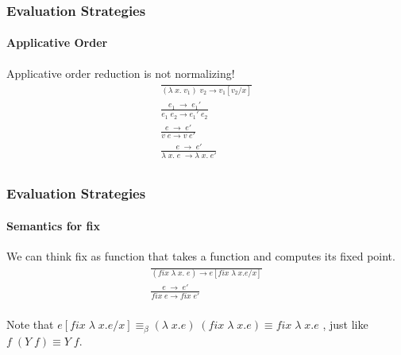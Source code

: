 \documentclass[xcolor=table]{beamer}
\begin{document}
\begin{frame}
\frametitle{Evaluation Strategies}
\framesubtitle{Applicative Order}
\begin{block}{Applicative order reduction is not normalizing!}
\begin{gather*}
\frac{}{ (\lambda \;x.\;v_1)\;v_2\rightarrow v_1 [v_2/x]} \\[0.3cm]
\frac{e_1\;\rightarrow \;e_1'}{e_1 \; e_2 \rightarrow e_1' \; e_2} \\[0.3cm]
\frac{e\;\rightarrow\;e'}{v \; e \rightarrow v \; e'} \\[0.3cm]
\frac{e\;\rightarrow\;e'}{\lambda\;x.\;e\; \rightarrow \lambda \;x. \;e'} \\[0.3cm]
\end{gather*}
\end{block}
\end{frame}

\begin{frame}
\frametitle{Evaluation Strategies}
\framesubtitle{Semantics for fix}
\begin{block}{We can think fix as function that takes a function and computes its fixed point.}
\begin{gather*}
\frac{}{ (fix \; \lambda \;x.\;e) \rightarrow e[fix \; \lambda \; x. e/x]} \\[0.3cm]
\frac{e\;\rightarrow\;e'}{fix \; e \rightarrow fix \; e'} \\[0.3cm]
\end{gather*}

Note that $e[fix \; \lambda \; x. e/x] \equiv_\beta (\lambda\; x. e) \; (fix \; \lambda \; x. e) \equiv fix \; \lambda \; x. e$ ,
just like $f \;(Y\; f) \equiv Y \; f$.
\end{block}
\end{frame}
\end{document}
